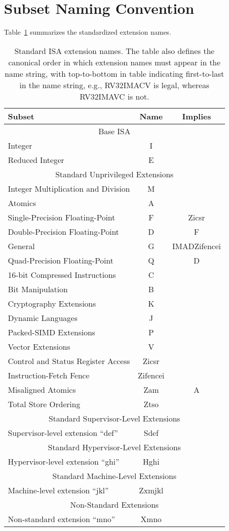 \section{Subset Naming Convention}
Table~\ref{isanametable} summarizes the standardized extension names.
~\\
\begin{table}[h]
\center
\begin{tabular}{|l|c|c|}
\hline
Subset & Name & Implies \\
\hline
\hline
\multicolumn{3}{|c|}{Base ISA}\\
\hline
Integer & I & \\
Reduced Integer & E & \\
\hline
\hline
\multicolumn{3}{|c|}{Standard Unprivileged Extensions}\\
\hline
Integer Multiplication and Division & M & \\
Atomics & A & \\
Single-Precision Floating-Point & F & Zicsr \\
Double-Precision Floating-Point & D & F \\
\hline
General & G & IMADZifencei \\
\hline
Quad-Precision Floating-Point & Q & D\\
16-bit Compressed Instructions & C & \\
Bit Manipulation & B & \\
Cryptography Extensions & K & \\
Dynamic Languages & J & \\
Packed-SIMD Extensions & P & \\
Vector Extensions & V & \\
Control and Status Register Access & Zicsr & \\
Instruction-Fetch Fence & Zifencei & \\
Misaligned Atomics & Zam & A \\
Total Store Ordering & Ztso & \\
\hline
\hline
\multicolumn{3}{|c|}{Standard Supervisor-Level Extensions}\\
\hline
Supervisor-level extension ``def'' & Sdef & \\
\hline
\hline
\multicolumn{3}{|c|}{Standard Hypervisor-Level Extensions}\\
\hline
Hypervisor-level extension ``ghi'' & Hghi & \\
\hline
\hline
\multicolumn{3}{|c|}{Standard Machine-Level Extensions}\\
\hline
Machine-level extension ``jkl'' & Zxmjkl & \\
\hline
\hline
\multicolumn{3}{|c|}{Non-Standard Extensions}\\
\hline
Non-standard extension ``mno'' & Xmno & \\
\hline
\end{tabular}
\caption{Standard ISA extension names.  The table also defines the
  canonical order in which extension names must appear in the name
  string, with top-to-bottom in table indicating first-to-last in the
  name string, e.g., RV32IMACV is legal, whereas RV32IMAVC is not.}
\label{isanametable}
\end{table}


